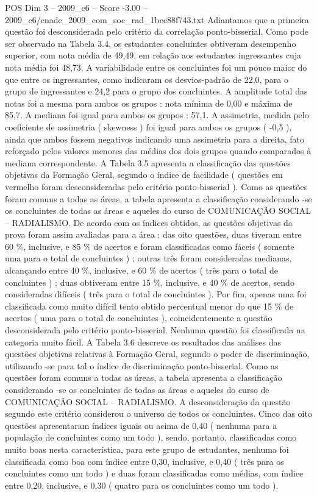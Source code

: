 \begin{textsample}{POS Dim 3 – 2009\_c6 – Score -3.00 – 2009\_c6/enade\_2009\_com\_soc\_rad\_1bee88f743.txt}
Adiantamos que a primeira questão foi desconsiderada pelo critério da correlação ponto-bisserial.
Como pode ser observado na Tabela 3.4, os estudantes concluintes obtiveram desempenho superior, com nota média de 49,49, em relação aos estudantes ingressantes cuja nota média foi 48,73.
A variabilidade entre os concluintes foi um pouco maior do que entre os ingressantes, como indicaram os desvios-padrão de 22,0, para o grupo de ingressantes e 24,2 para o grupo dos concluintes.
A amplitude total das notas foi a mesma para ambos os grupos : nota mínima de 0,00 e máxima de 85,7.
A mediana foi igual para ambos os grupos : 57,1.
A assimetria, medida pelo coeficiente de assimetria ( skewness ) foi igual para ambos os grupos ( -0,5 ), ainda que ambos fossem negativos indicando uma assimetria para a direita, fato reforçado pelos valores menores das médias dos dois grupos quando comparados à mediana correspondente.
A Tabela 3.5 apresenta a classificação das questões objetivas da Formação Geral, segundo o índice de facilidade ( questões em vermelho foram desconsideradas pelo critério ponto-bisserial ).
Como as questões foram comuns a todas as áreas, a tabela apresenta a classificação considerando -se os concluintes de todas as áreas e aqueles do curso de COMUNICAÇÃO SOCIAL – RADIALISMO.
De acordo com os índices obtidos, as questões objetivas da prova foram assim avaliadas para a área : das oito questões, duas tiveram entre 60 \%, inclusive, e 85 \% de acertos e foram classificadas como fáceis ( somente uma para o total de concluintes ) ; outras três foram consideradas medianas, alcançando entre 40 \%, inclusive, e 60 \% de acertos ( três para o total de concluintes ) ; duas obtiveram entre 15 \%, inclusive, e 40 \% de acertos, sendo consideradas difíceis ( três para o total de concluintes ).
Por fim, apenas uma foi classificada como muito difícil tento obtido percentual menor do que 15 \% de acertos ( uma para o total de concluintes ), coincidentemente a questão desconsiderada pelo critério ponto-bisserial.
Nenhuma questão foi classificada na categoria muito fácil.
A Tabela 3.6 descreve os resultados das análises das questões objetivas relativas à Formação Geral, segundo o poder de discriminação, utilizando -se para tal o índice de discriminação ponto-bisserial.
Como as questões foram comuns a todas as áreas, a tabela apresenta a classificação considerando -se os concluintes de todas as áreas e aqueles do curso de COMUNICAÇÃO SOCIAL – RADIALISMO.
A desconsideração da questão segundo este critério considerou o universo de todos os concluintes.
Cinco das oito questões apresentaram índices iguais ou acima de 0,40 ( nenhuma para a população de concluintes como um todo ), sendo, portanto, classificadas como muito boas nesta característica, para este grupo de estudantes, nenhuma foi classificada como boa com índice entre 0,30, inclusive, e 0,40 ( três para os concluintes como um todo ) e duas foram classificadas como médias, com índice entre 0,20, inclusive, e 0,30 ( quatro para os concluintes como um todo ).

\end{textsample}
